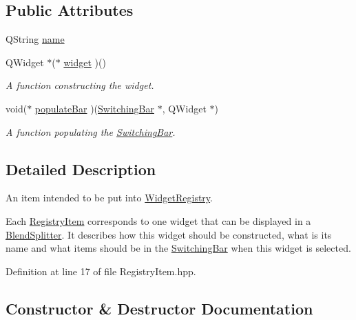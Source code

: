\subsection*{Public Attributes}
\begin{DoxyCompactItemize}
\item 
Q\+String \hyperlink{class_registry_item_a662d7e2c473bea72a0549caf63ea5bfd}{name}
\item 
Q\+Widget $\ast$($\ast$ \hyperlink{class_registry_item_aa95c5a5dbfdf491e53b07dbc0a027e14}{widget} )()
\begin{DoxyCompactList}\small\item\em A function constructing the widget. \end{DoxyCompactList}\item 
void($\ast$ \hyperlink{class_registry_item_a0784869b48c86a581e12c88fd2706cd0}{populate\+Bar} )(\hyperlink{class_switching_bar}{Switching\+Bar} $\ast$, Q\+Widget $\ast$)
\begin{DoxyCompactList}\small\item\em A function populating the \hyperlink{class_switching_bar}{Switching\+Bar}. \end{DoxyCompactList}\end{DoxyCompactItemize}


\subsection{Detailed Description}
An item intended to be put into \hyperlink{class_widget_registry}{Widget\+Registry}. 

Each \hyperlink{class_registry_item}{Registry\+Item} corresponds to one widget that can be displayed in a \hyperlink{class_blend_splitter}{Blend\+Splitter}. It describes how this widget should be constructed, what is its name and what items should be in the \hyperlink{class_switching_bar}{Switching\+Bar} when this widget is selected. 

Definition at line 17 of file Registry\+Item.\+hpp.



\subsection{Constructor \& Destructor Documentation}
